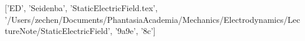 ['ED', 'Seidenba', 'StaticElectricField.tex', '/Users/zechen/Documents/PhantasiaAcademia/Mechanics/Electrodynamics/LectureNote/StaticElectricField', '\x9a\x9e\xbc{}', '\x8c\xbc{}']
